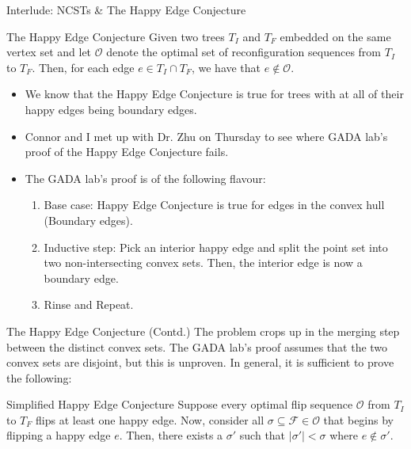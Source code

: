 \documentclass[11pt]{beamer}
\begin{document}
\begin{frame}{Interlude: NCSTs \& The Happy Edge Conjecture}
	\begin{block}{The Happy Edge Conjecture}
		Given two trees $T_I$ and $T_F$ embedded on the same vertex set and let $\mathcal{O}$ denote the optimal set of reconfiguration sequences from $T_I$ to $T_F$. Then, for each edge $e \in T_I \cap T_F$, we have that $e \not\in \mathcal{O}$.
	\end{block}

	\pause
	\begin{itemize}
		\item We know that the Happy Edge Conjecture is true for trees with at all of their happy edges being boundary edges.
		      \pause
		\item Connor and I met up with Dr. Zhu on Thursday to see where GADA lab's proof of the Happy Edge Conjecture fails.
		      \pause
		\item The GADA lab's proof is of the following flavour:
		      \begin{enumerate}
			      \item Base case: Happy Edge Conjecture is true for edges in the convex hull (Boundary edges).
			      \item Inductive step: Pick an interior happy edge and split the point set into two non-intersecting convex sets. Then, the interior edge is now a boundary edge.
			      \item Rinse and Repeat.
		      \end{enumerate}
	\end{itemize}
\end{frame}

\begin{frame}{The Happy Edge Conjecture (Contd.)}
	The problem crops up in the merging step between the distinct convex sets. The GADA lab's proof assumes that the two convex sets are disjoint, but this is unproven. In general, it is sufficient to prove the following:

	\begin{block}{Simplified Happy Edge Conjecture}
		Suppose every optimal flip sequence $\mathcal{O}$ from $T_I$ to $T_F$ flips at least one happy edge. Now, consider all $\sigma \subseteq \mathcal{F} \in \mathcal{O}$ that begins by flipping a happy edge $e$. Then, there exists a $\sigma'$ such that $|\sigma'| < \sigma$ where $e \not\in \sigma'$.
	\end{block}
\end{frame}
\end{document}
